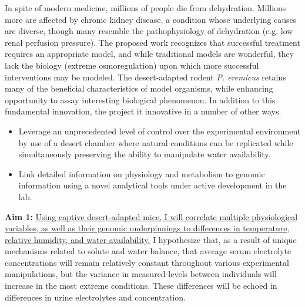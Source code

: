 \documentclass[11pt]{article}
\begin{document}
In spite of modern medicine, millions of people die from dehydration. Millions more are affected by chronic kidney disease, a condition whose underlying causes are diverse, though many resemble the pathophysiology of dehydration (e.g. low renal perfusion pressure). The proposed work recognizes that successful treatment requires an appropriate model, and while traditional models are wonderful, they lack the biology (extreme osmoregulation) upon which more successful interventions may be modeled. The desert-adapted rodent \textit{P. eremicus} retains many of the beneficial characteristics of model organisms, while enhancing opportunity to assay interesting biological phenomenon. In addition to this fundamental innovation, the project it innovative in a number of other ways.
\begin{itemize}
\item Leverage an unprecedented level of control over the experimental environment by use of a desert chamber where natural conditions can be replicated while simultaneously preserving the ability to manipulate water availability. 
\item Link detailed information on physiology and metabolism to genomic information using a novel analytical tools under active development in the lab.
\end{itemize}

 

\newpage

\linespread{1.2}

\noindent \textbf{Aim 1:} \ul{Using captive desert-adapted mice, I will correlate multiple physiological variables, as well as their genomic underpinnings to differences in temperature, relative humidity, and water availability.} I hypothesize that, as a result of unique mechanisms related to solute and water balance, that average serum electrolyte concentrations will remain relatively constant throughout various experimental manipulations, but the variance in measured levels between individuals will increase in the most extreme conditions. These differences will be echoed in differences in urine electrolytes and concentration. \\
\end{document}
